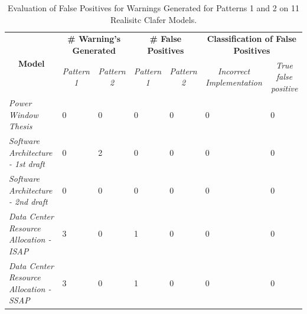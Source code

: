 \documentclass[10pt,oneside]{IEEEtran}
\begin{document}
\begin{table}[h]
\centering
\caption{Evaluation of False Positives for Warnings Generated for Patterns 1 and 2 on 11 Realisitc Clafer Models.}
\label{lst:falsePositive}
\begin{tabular}{@{}l|llllll@{}}
\multicolumn{1}{c|}{\multirow{2}{*}{{\bf Model}}} & \multicolumn{2}{c|}{{\bf \# Warning's Generated}}                         & \multicolumn{2}{c}{{\bf \# False Positives}}                              & \multicolumn{2}{c}{{\bf Classification of False Positives}}                                        \\ \cmidrule(l){2-7}
\multicolumn{1}{c|}{}                             & \multicolumn{1}{c}{{\it Pattern 1}} & \multicolumn{1}{c}{{\it Pattern 2}} & \multicolumn{1}{c}{{\it Pattern 1}} & \multicolumn{1}{c}{{\it Pattern 2}} & \multicolumn{1}{c}{{\it Incorrect Implementation}} & \multicolumn{1}{c}{{\it True false positive}} \\ \midrule
{\it Power Window Thesis}                         & 0                                   & 0                                   & 0                                   & 0                                   & 0                                                  & 0                                             \\ \midrule
{\it Software Architecture - 1st draft}           & 0                                   & 2                                   & 0                                   & 0                                   & 0                                                  & 0                                             \\ \midrule
{\it Software Architecture - 2nd draft}           & 0                                   & 0                                   & 0                                   & 0                                   & 0                                                  & 0                                             \\ \midrule
{\it Data Center Resource Allocation - ISAP}      & 3                                   & 0                                   & 1                                   & 0                                   & 0                                                  & 0                                             \\ \midrule
{\it Data Center Resource Allocation - SSAP}      & 3                                   & 0                                   & 1                                   & 0                                   & 0                                                  & 0                                             \\ \midrule

\end{tabular}
\end{table}
\end{document}
